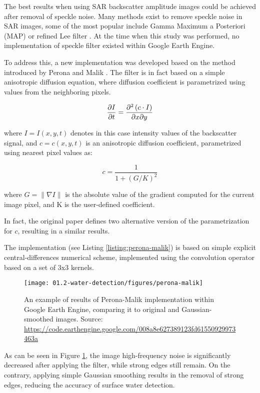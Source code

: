 The best results when using SAR backscatter amplitude images could be achieved after removal of speckle noise. Many methods exist to remove speckle noise in SAR images, some of the most popular include Gamma Maximum a Posteriori (MAP) \citep{lopes1990maximum} or refined Lee filter \citep{lee1981speckle}. At the time when this study was performed, no implementation of speckle filter existed within Google Earth Engine. 

To address this, a new implementation was developed based on the method introduced by Perona and Malik \citep{perona1990scale}. The filter is in fact based on a simple anisotropic diffusion equation, where diffusion coefficient is parametrized using values from the neighboring pixels. 

\begin{equation}
\pdv{I}{t} = \pdv[2]{ \left(c \cdot I\right)}{x}{y}
\end{equation}

where $I=I(x,y,t)$ denotes in this case intensity values of the backscatter signal, and $c=c(x,y,t)$ is an anisotropic diffusion coefficient, parametrized using nearest pixel values as:

\begin{equation}
c = \frac{1}{1 + \left(G/K\right)^2}
\end{equation}

where $G = \| \nabla I\|$ is the absolute value of the gradient computed for the current image pixel, and K is the user-defined coefficient.

In fact, the original paper defines two alternative version of the parametrization for $c$, resulting in a similar results.


The implementation (see Listing \ref{listing:perona-malik}) is based on simple explicit central-differences numerical scheme, implemented using the convolution operator based on a set of 3x3 kernels. 

\begin{figure}[H]
	\texttt{[image: 01.2-water-detection/figures/perona-malik]}
	\caption{An example of results of Perona-Malik implementation within Google Earth Engine, comparing it to original and Gaussian-smoothed images. Source: \url{https://code.earthengine.google.com/008a8e627389123fd61550929973463a}}
	\label{fig:perona-malik}
\end{figure}

As can be seen in Figure \ref{fig:perona-malik}, the image high-frequency noise is significantly decreased after applying the filter, while strong edges still remain. On the contrary, applying simple Gaussian smoothing results in the removal of strong edges, reducing the accuracy of surface water detection.


